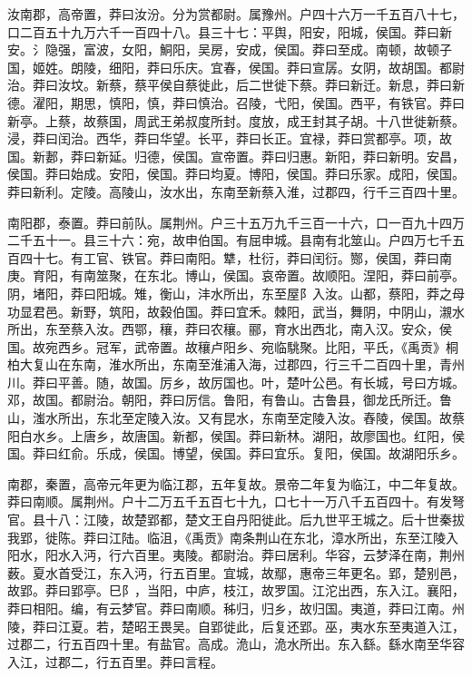\documentclass[]{article}
\begin{document}
汝南郡，高帝置，莽曰汝汾。分为赏都尉。属豫州。户四十六万一千五百八十七，口二百五十九万六千一百四十八。县三十七：平舆，阳安，阳城，侯国。莽曰新安。氵隐强，富波，女阳，鮦阳，吴房，安成，侯国。莽曰至成。南顿，故顿子国，姬姓。朗陵，细阳，莽曰乐庆。宜春，侯国。莽曰宣孱。女阴，故胡国。都尉治。莽曰汝坟。新蔡，蔡平侯自蔡徙此，后二世徙下蔡。莽曰新迁。新息，莽曰新德。濯阳，期思，慎阳，慎，莽曰慎治。召陵，弋阳，侯国。西平，有铁官。莽曰新亭。上蔡，故蔡国，周武王弟叔度所封。度放，成王封其子胡。十八世徙新蔡。浸，莽曰闰治。西华，莽曰华望。长平，莽曰长正。宜禄，莽曰赏都亭。项，故国。新郪，莽曰新延。归德，侯国。宣帝置。莽曰归惠。新阳，莽曰新明。安昌，侯国。莽曰始成。安阳，侯国。莽曰均夏。博阳，侯国。莽曰乐家。成阳，侯国。莽曰新利。定陵。高陵山，汝水出，东南至新蔡入淮，过郡四，行千三百四十里。

南阳郡，泰置。莽曰前队。属荆州。户三十五万九千三百一十六，口一百九十四万二千五十一。县三十六：宛，故申伯国。有屈申城。县南有北筮山。户四万七千五百四十七。有工官、铁官。莽曰南阳。犨，杜衍，莽曰闰衍。酂，侯国，莽曰南庚。育阳，有南筮聚，在东北。博山，侯国。哀帝置。故顺阳。涅阳，莽曰前亭。阴，堵阳，莽曰阳城。雉，衡山，沣水所出，东至屋阝入汝。山都，蔡阳，莽之母功显君邑。新野，筑阳，故穀伯国。莽曰宜禾。棘阳，武当，舞阴，中阴山，瀙水所出，东至蔡入汝。西鄂，穰，莽曰农穰。郦，育水出西北，南入汉。安众，侯国。故宛西乡。冠军，武帝置。故穰卢阳乡、宛临駣聚。比阳，平氏，《禹贡》桐柏大复山在东南，淮水所出，东南至淮浦入海，过郡四，行三千二百四十里，青州川。莽曰平善。随，故国。厉乡，故厉国也。叶，楚叶公邑。有长城，号曰方城。邓，故国。都尉治。朝阳，莽曰厉信。鲁阳，有鲁山。古鲁县，御龙氏所迁。鲁山，滍水所出，东北至定陵入汝。又有昆水，东南至定陵入汝。舂陵，侯国。故蔡阳白水乡。上唐乡，故唐国。新都，侯国。莽曰新林。湖阳，故廖国也。红阳，侯国。莽曰红俞。乐成，侯国。博望，侯国。莽曰宜乐。复阳，侯国。故湖阳乐乡。

南郡，秦置，高帝元年更为临江郡，五年复故。景帝二年复为临江，中二年复故。莽曰南顺。属荆州。户十二万五千五百七十九，口七十一万八千五百四十。有发弩官。县十八：江陵，故楚郢都，楚文王自丹阳徙此。后九世平王城之。后十世秦拔我郢，徙陈。莽曰江陆。临沮，《禹贡》南条荆山在东北，漳水所出，东至江陵入阳水，阳水入沔，行六百里。夷陵。都尉治。莽曰居利。华容，云梦泽在南，荆州薮。夏水首受江，东入沔，行五百里。宜城，故鄢，惠帝三年更名。郢，楚别邑，故郢。莽曰郢亭。巳阝，当阳，中庐，枝江，故罗国。江沱出西，东入江。襄阳，莽曰相阳。编，有云梦官。莽曰南顺。秭归，归乡，故归国。夷道，莽曰江南。州陵，莽曰江夏。若，楚昭王畏吴。自郢徙此，后复还郢。巫，夷水东至夷道入江，过郡二，行五百四十里。有盐官。高成。洈山，洈水所出。东入繇。繇水南至华容入江，过郡二，行五百里。莽曰言程。
\end{document}
